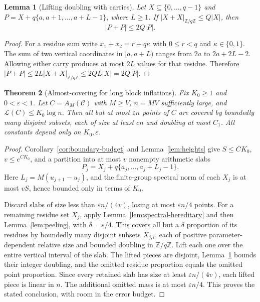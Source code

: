 \documentclass[11pt,reqno]{amsart}
\numberwithin{equation}{section}
\newtheorem{theorem}{Theorem}[section]
\newtheorem{lemma}[theorem]{Lemma}
\theoremstyle{definition}
\theoremstyle{remark}
\newcommand{\Z}{\mathbb Z}
\newcommand{\La}{\mathcal L}
\newcommand{\eps}{\varepsilon}
\begin{document}
\begin{lemma}[Lifting doubling with carries]\label{lem:carry-lift}
Let $X\subseteq\{0,\ldots,q-1\}$ and
$P=X+q\{a,a+1,\ldots,a+L-1\}$, where $L\ge1$. If
$|X+X|_{\Z/q\Z}\le Q|X|$, then
\begin{equation}\label{eq:carry-doubling}
 |P+P|\le2Q|P|.
\end{equation}
\end{lemma}
\begin{proof}
For a residue sum write $x_1+x_2=r+q\kappa$ with
$0\le r<q$ and $\kappa\in\{0,1\}$. The sum of two vertical coordinates
in $[a,a+L)$ ranges from $2a$ to $2a+2L-2$. Allowing either carry
produces at most $2L$ values for that residue. Therefore
$|P+P|\le2L|X+X|_{\Z/q\Z}\le2QL|X|=2Q|P|$.
\end{proof}

\begin{theorem}[Almost-covering for long block inflations]
\label{thm:block-cover}
Fix $K_0\ge1$ and $0<\eps<1$. Let $C=A_M(\mathcal C)$ with
$M\ge V$, $n=MV$ sufficiently large, and $\La(C)\le K_0\log n$.
Then all but at most $\eps n$ points of $C$ are covered by boundedly
many disjoint subsets, each of size at least $cn$ and doubling at most
$C_1$. All constants depend only on $K_0,\eps$.
\end{theorem}
\begin{proof}
Corollary~\ref{cor:boundary-budget} and Lemma~\ref{lem:heights} give
$S\le CK_0$, $v\le e^{CK_0}$, and a partition into at most $v$
nonempty arithmetic slabs
\[
 P_j=X_j+q\{a_j,\ldots,a_j+L_j-1\}.
\]
Here $L_j=M(u_{j+1}-u_j)$, and the finite-group spectral norm of each
$X_j$ is at most $vS$, hence bounded only in terms of $K_0$.

Discard slabs of size less than $\eps n/(4v)$, losing at most
$\eps n/4$ points. For a remaining residue set $X_j$, apply
Lemma~\ref{lem:spectral-hereditary} and then
Lemma~\ref{lem:peeling}, with $\delta=\eps/4$. This covers all but a
$\delta$ proportion of its residues by boundedly many disjoint subsets
$X_{j,l}$, each of positive parameter-dependent relative size and
bounded doubling in $\Z/q\Z$. Lift each one over the entire vertical
interval of the slab. The lifted pieces are disjoint,
Lemma~\ref{lem:carry-lift} bounds their integer doubling, and the
omitted residue proportion equals the omitted point proportion.
Since every retained slab has size at least $\eps n/(4v)$, each
lifted piece is linear in $n$. The additional omitted mass is at most
$\eps n/4$. This proves the stated conclusion, with room in the error
budget.
\end{proof}
\end{document}
